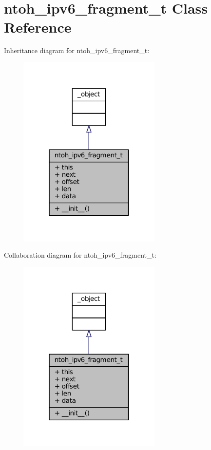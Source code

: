 \hypertarget{classlibntoh_1_1ntoh__ipv6__fragment__t}{\section{ntoh\-\_\-ipv6\-\_\-fragment\-\_\-t Class Reference}
\label{classlibntoh_1_1ntoh__ipv6__fragment__t}
}


Inheritance diagram for ntoh\-\_\-ipv6\-\_\-fragment\-\_\-t\-:
\nopagebreak
\begin{figure}[H]
\begin{center}
\leavevmode
\includegraphics[width=202pt]{classlibntoh_1_1ntoh__ipv6__fragment__t__inherit__graph}
\end{center}
\end{figure}


Collaboration diagram for ntoh\-\_\-ipv6\-\_\-fragment\-\_\-t\-:
\nopagebreak
\begin{figure}[H]
\begin{center}
\leavevmode
\includegraphics[width=202pt]{classlibntoh_1_1ntoh__ipv6__fragment__t__coll__graph}
\end{center}
\end{figure}
